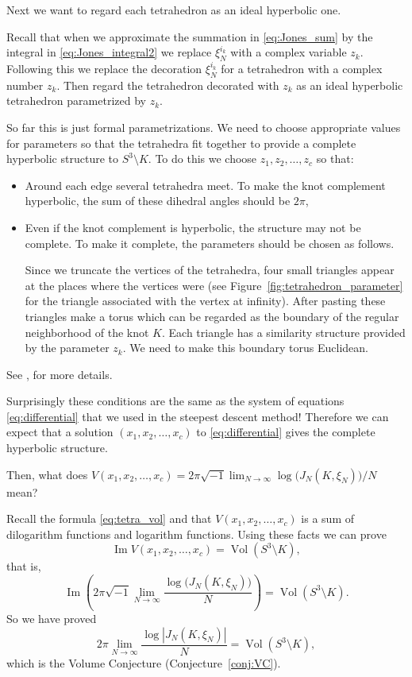 \documentclass{amsart}
\newcommand{\Vol}{\operatorname{Vol}}
\renewcommand{\Im}{\operatorname{Im}}
\theoremstyle{definition}
\theoremstyle{remark}
\numberwithin{equation}{section}
\begin{document}
Next we want to regard each tetrahedron as an ideal hyperbolic one.
\par
Recall that when we approximate the summation in \eqref{eq:Jones_sum} by the integral in \eqref{eq:Jones_integral2} we replace $\xi_N^{i_k}$ with a complex variable $z_k$.
Following this we replace the decoration $\xi_N^{i_k}$ for a tetrahedron with a complex number $z_k$.
Then regard the tetrahedron decorated with $z_k$ as an ideal hyperbolic tetrahedron parametrized by $z_k$.
\par
So far this is just formal parametrizations.
We need to choose appropriate values for parameters so that the tetrahedra fit together to provide a complete hyperbolic structure to $S^3\setminus{K}$.
To do this we choose $z_1,z_2,\dots,z_c$ so that:
\begin{itemize}
\item
Around each edge several tetrahedra meet.
To make the knot complement hyperbolic, the sum of these dihedral angles should be $2\pi$,
\item
Even if the knot complement is hyperbolic, the structure may not be complete.
To make it complete, the parameters should be chosen as follows.
\par
Since we truncate the vertices of the tetrahedra, four small triangles appear at the places where the vertices were (see Figure~\ref{fig:tetrahedron_parameter} for the triangle associated with the vertex at infinity).
After pasting these triangles make a torus which can be regarded as the boundary of the regular neighborhood of the knot $K$.
Each triangle has a similarity structure provided by the parameter $z_k$.
We need to make this boundary torus Euclidean.
\end{itemize}
See \cite[Chapter~4]{Thurston:GT3M},\cite[\S~2]{Neumann/Zagier:TOPOL85} for more details.
\par
Surprisingly these conditions are the same as the system of equations \eqref{eq:differential} that we used in the steepest descent method!
Therefore we can expect that a solution $(x_1,x_2,\dots,x_c)$ to \eqref{eq:differential} gives the complete hyperbolic structure.
\par
Then, what does $V(x_1,x_2,\dots,x_c)=2\pi\sqrt{-1}\lim_{N\to\infty}\log\bigl(J_N(K,\xi_N)\bigr)/N$ mean?
\par
Recall the formula \eqref{eq:tetra_vol} and that $V(x_1,x_2,\dots,x_c)$ is a sum of dilogarithm functions and logarithm functions.
Using these facts we can prove
\begin{equation*}
  \Im{V(x_1,x_2,\dots,x_c)}
  =
  \Vol(S^3\setminus{K}),
\end{equation*}
that is,
\begin{equation*}
  \Im
  \left(
    2\pi\sqrt{-1}\lim_{N\to\infty}\frac{\log\bigl(J_N(K,\xi_N)\bigr)}{N}
  \right)
  =
  \Vol(S^3\setminus{K}).
\end{equation*}
So we have proved
\begin{equation*}
  2\pi\lim_{N\to\infty}\frac{\log|J_N(K,\xi_N)|}{N}
  =
  \Vol(S^3\setminus{K}),
\end{equation*}
which is the Volume Conjecture (Conjecture~\ref{conj:VC}).
\end{document}
